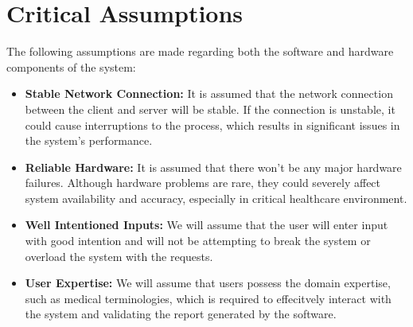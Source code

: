 \documentclass{article}
\begin{document}
\section{Critical Assumptions}

The following assumptions are made regarding both the software and hardware components of the system:

\begin{itemize}
    \item \textbf{Stable Network Connection:} It is assumed that the network connection between the client and server will be stable. If the connection is unstable, it could cause interruptions to the process, which results in significant issues in the system's performance.
        
    \item \textbf{Reliable Hardware:} It is assumed that there won't be any major hardware failures. Although hardware problems are rare, they could severely affect system availability and accuracy, especially in critical healthcare environment.

    \item \textbf{Well Intentioned Inputs:} We will assume that the user will enter input with good intention and will not be attempting to break the system or overload the system with the requests.
    
    \item \textbf{User Expertise:} We will assume that users possess the domain expertise, such as medical terminologies, which is required to effecitvely interact with the system and validating the report generated by the software.
\end{itemize}
\end{document}
